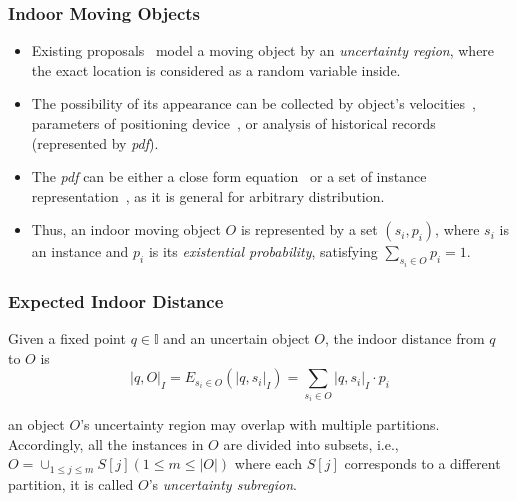 
\begin{frame}
\frametitle{Indoor Moving Objects}

\begin{itemize}
  \item Existing proposals~\cite{pfoser1999capturing, DBLP:conf/edbt/YangLJ10} model a moving object by an \emph{uncertainty region}, where the exact location is considered as a random variable inside.
  \item The possibility of its appearance can be collected by object's velocities~\cite{DBLP:conf/edbt/YangLJ10}, parameters of positioning device~\cite{pfoser1999capturing}, or analysis of historical records (represented by \emph{pdf}).
  \item The \emph{pdf} can be either a close form equation~\cite{cheng2003evaluating,cheng2004querying} or a set of instance representation~\cite{kriegel2007probabilistic}, as it is general for arbitrary distribution.
  \item Thus, an indoor moving object $O$ is represented by a set ${(s_i, p_i)}$, where $s_i$ is an instance and $p_i$ is its \emph{existential probability}, satisfying $\sum_{s_i \in O}p_i = 1$.
\end{itemize}

\end{frame}


\begin{frame}
\frametitle{Expected Indoor Distance}

\begin{definition}
  Given a fixed point $q \in \mathbb{I}$ and an uncertain object $O$, the indoor distance from $q$ to $O$ is
  \begin{equation}
    |q, O|_{I} = E_{s_i \in O}(|q,s_i|_{I}) = \sum_{s_i \in O}|q,s_i|_{I} \cdot p_i
  \end{equation}
\end{definition}
\vspace{10pt}
an object $O$'s uncertainty region may overlap with multiple partitions. Accordingly, all the instances in $O$ are divided into subsets, i.e., $O = \cup_{1 \leq j \leq m}S[j](1 \leq m \leq |O|)$ where each $S[j]$ corresponds to a different partition, it is called $O$'s \emph{uncertainty subregion}.

\end{frame}

